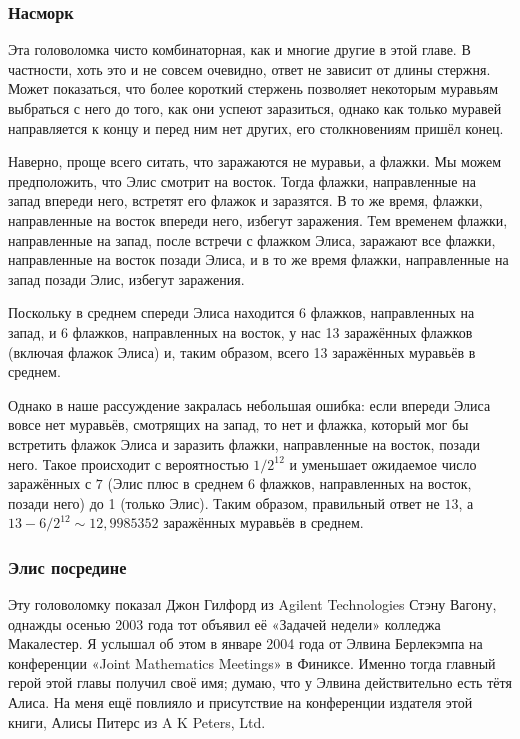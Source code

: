 \subsubsection*{Насморк}

Эта головоломка чисто комбинаторная, как и многие другие в этой главе.
В частности, хоть это и не совсем очевидно, ответ не зависит от длины стержня.
Может показаться, что более короткий стержень позволяет некоторым муравьям выбраться с него до того, как они успеют заразиться, однако как только муравей направляется к концу и перед ним нет других, его столкновениям пришёл конец.

Наверно, проще всего ситать, что заражаются не муравьи, а флажки.
Мы можем предположить, что Элис смотрит на восток.
Тогда флажки, направленные на запад впереди него, встретят его флажок и заразятся.
В то же время, флажки, направленные на восток впереди него, избегут заражения.
Тем временем флажки, направленные на запад, после встречи с флажком Элиса, заражают все флажки, направленные на восток позади Элиса, и в то же время флажки, направленные на запад позади Элис, избегут заражения.

Поскольку в среднем спереди Элиса находится 6 флажков, направленных на запад, и 6 флажков, направленных на восток, у нас 13 заражённых флажков (включая флажок Элиса) и, таким образом, всего 13 заражённых муравьёв в среднем.

Однако в наше рассуждение закралась небольшая ошибка: если впереди Элиса вовсе нет муравьёв, смотрящих на запад, то нет и флажка, который мог бы встретить флажок Элиса и заразить флажки, направленные на восток, позади него.
Такое происходит с вероятностью $1/2^{12}$ и уменьшает ожидаемое число заражённых с $7$ (Элис плюс в среднем 6 флажков, направленных на восток, позади него) до 1 (только Элис).
Таким образом, правильный ответ не $13$, а $13 - 6/2^{12} \sim 12{,}9985352$ заражённых муравьёв в среднем.

\subsubsection*{Элис посредине}

Эту головоломку показал Джон Гилфорд из Agilent Technologies Стэну Вагону,
однажды осенью 2003 года тот объявил её «Задачей недели» колледжа Макалестер.
Я услышал об этом в январе 2004 года от Элвина Берлекэмпа на конференции «Joint Mathematics Meetings» в Финиксе.
Именно тогда главный герой этой главы получил своё имя;
думаю, что у Элвина действительно есть тётя Алиса.
На меня ещё повлияло и присутствие на конференции издателя этой книги, Алисы Питерс из A K Peters, Ltd.

